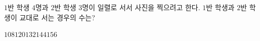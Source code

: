 $1$반 학생 $4$명과 $2$반 학생 $3$명이 일렬로 서서 사진을 찍으려고 한다. $1$반 학생과 $2$반 학생이 교대로 서는 경우의 수는?
\begin{choices32}{$108$}{$120$}{$132$}{$144$}{$156$}\end{choices32}
